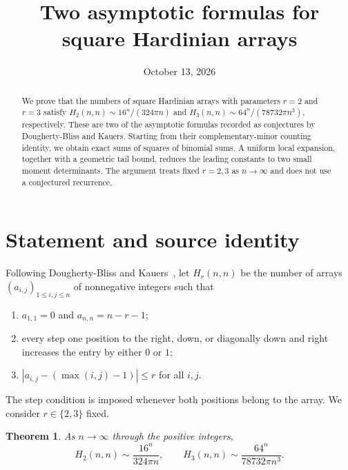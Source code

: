 \documentclass[11pt]{article}
\title{Two asymptotic formulas for square Hardinian arrays}
\author{}
\date{October 13, 2026}
\newtheorem{theorem}{Theorem}
\begin{document}
\maketitle

\begin{abstract}
We prove that the numbers of square Hardinian arrays with parameters
$r=2$ and $r=3$ satisfy
$H_2(n,n)\sim16^n/(324\pi n)$ and
$H_3(n,n)\sim64^n/(78732\pi n^3)$, respectively.
These are two of the asymptotic formulas recorded as conjectures by Dougherty-Bliss
and Kauers. Starting from their complementary-minor counting identity,
we obtain exact sums of squares of binomial sums. A uniform local
expansion, together with a geometric tail bound, reduces the leading
constants to two small moment determinants. The argument treats fixed
$r=2,3$ as $n\to\infty$ and does not use a conjectured recurrence.
\end{abstract}

\section{Statement and source identity}

Following Dougherty-Bliss and Kauers~\cite{dk}, let $H_r(n,n)$ be the
number of arrays $(a_{i,j})_{1\le i,j\le n}$ of nonnegative integers such
that
\begin{enumerate}
\item $a_{1,1}=0$ and $a_{n,n}=n-r-1$;
\item every step one position to the right, down, or diagonally down and
right increases the entry by either $0$ or $1$;
\item $|a_{i,j}-(\max(i,j)-1)|\le r$ for all $i,j$.
\end{enumerate}
The step condition is imposed whenever both positions belong to the
array. We consider $r\in\{2,3\}$ fixed.

\begin{theorem}\label{thm:main}
As $n\to\infty$ through the positive integers,
\[
 H_2(n,n)\sim\frac{16^n}{324\pi n},\qquad
 H_3(n,n)\sim\frac{64^n}{78732\pi n^3}.
\]
\end{theorem}
\end{document}
